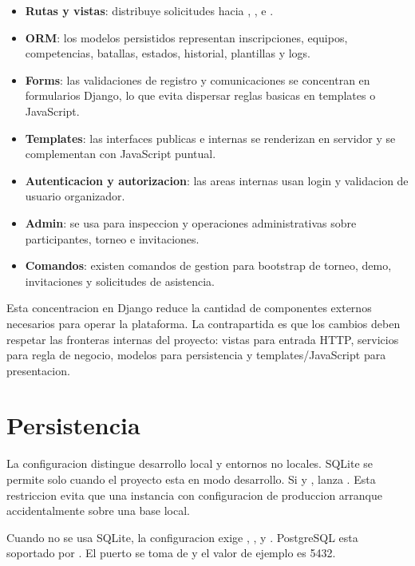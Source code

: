\begin{itemize}
  \item \textbf{Rutas y vistas}:  distribuye solicitudes hacia , ,  e .
  \item \textbf{ORM}: los modelos persistidos representan inscripciones, equipos, competencias, batallas, estados, historial, plantillas y logs.
  \item \textbf{Forms}: las validaciones de registro y comunicaciones se concentran en formularios Django, lo que evita dispersar reglas basicas en templates o JavaScript.
  \item \textbf{Templates}: las interfaces publicas e internas se renderizan en servidor y se complementan con JavaScript puntual.
  \item \textbf{Autenticacion y autorizacion}: las areas internas usan login y validacion de usuario organizador.
  \item \textbf{Admin}: se usa para inspeccion y operaciones administrativas sobre participantes, torneo e invitaciones.
  \item \textbf{Comandos}: existen comandos de gestion para bootstrap de torneo, demo, invitaciones y solicitudes de asistencia.
\end{itemize}

Esta concentracion en Django reduce la cantidad de componentes externos necesarios para operar la plataforma. La contrapartida es que los cambios deben respetar las fronteras internas del proyecto: vistas para entrada HTTP, servicios para regla de negocio, modelos para persistencia y templates/JavaScript para presentacion.

\section{Persistencia}
\label{sec:tecnologias-persistencia}

La configuracion distingue desarrollo local y entornos no locales. SQLite se permite solo cuando el proyecto esta en modo desarrollo. Si  y ,  lanza . Esta restriccion evita que una instancia con configuracion de produccion arranque accidentalmente sobre una base local.

Cuando no se usa SQLite, la configuracion exige , ,  y . PostgreSQL esta soportado por . El puerto se toma de  y el valor de ejemplo es 5432.

